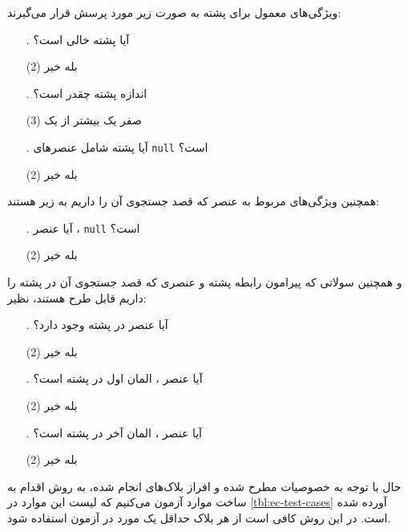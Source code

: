 \documentclass[twoside]{article}
\newenvironment{answer}{}{\medskip}
\begin{document}
\begin{answer}
ویژگی‌های معمول برای پشته به صورت زیر مورد پرسش قرار می‌گیرند:
\begin{enumerate}
	\item[\lr{\textbf{A}}.]
آیا پشته خالی است؟
	\begin{tasks}(2)
		\task[\lr{1}. ]
بله
		\task[\lr{2}. ]
خیر
	\end{tasks}
	\item[\lr{\textbf{B}}.]
اندازه پشته چقدر است؟
	\begin{tasks}(3)
		\task[\lr{1}. ]
صفر
		\task[\lr{2}. ]
یک
		\task[\lr{3}. ]
بیشتر از یک
	\end{tasks}
	\item[\lr{\textbf{C}}.]
آیا پشته شامل عنصرهای \texttt{null} است؟
	\begin{tasks}(2)
		\task[\lr{1}. ]
بله
		\task[\lr{2}. ]
خیر
	\end{tasks}
\end{enumerate}
همچنین ویژگی‌های مربوط به عنصر که قصد جستجوی آن را داریم به زیر هستند:
\begin{enumerate}[label=.\Alph*]
	\item[\lr{\textbf{D}}.]
آیا عنصر ، \texttt{null} است؟
	\begin{tasks}(2)
		\task[\lr{1}. ]
بله
		\task[\lr{2}. ]
خیر
	\end{tasks}
\end{enumerate}
و همچنین سولاتی که پیرامون رابطه پشته و عنصری که قصد جستجوی آن در پشته را داریم قابل طرح هستند، نظیر:
\begin{enumerate}[label=.\Alph*]
	\item[\lr{\textbf{E}}.]
آیا عنصر  در پشته وجود دارد؟
	\begin{tasks}(2)
		\task[\lr{1}. ]
بله
		\task[\lr{2}. ]
خیر
	\end{tasks}
	\item[\lr{\textbf{F}}.]
آیا عنصر ، المان اول در پشته است؟
	\begin{tasks}(2)
		\task[\lr{1}. ]
بله
		\task[\lr{2}. ]
خیر
	\end{tasks}
	\item[\lr{\textbf{G}}.]
آیا عنصر ، المان آخر در پشته است؟
	\begin{tasks}(2)
		\task[\lr{1}. ]
بله
		\task[\lr{2}. ]
خیر
	\end{tasks}
\end{enumerate}
حال با توجه به خصوصیات مطرح شده و افراز بلاک‌های انجام شده، به روش %
اقدام به ساخت موارد آزمون می‌کنیم که لیست این موارد در \autoref{tbl:ec-test-cases} آورده شده است. در این روش کافی است از هر بلاک حداقل یک مورد در آزمون استفاده شود.


\end{answer}
\end{document}
